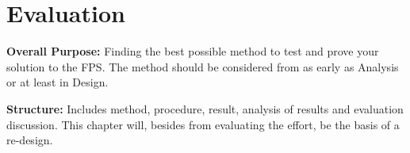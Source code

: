 \section{Evaluation}
\textbf{Overall Purpose:} Finding the best possible method to test and prove your solution to the FPS. The method should be considered from as early as Analysis or at least in Design.

\noindent\textbf{Structure:} Includes method, procedure, result, analysis of results and evaluation discussion. This chapter will, besides from evaluating the effort, be the basis of a re-design.
